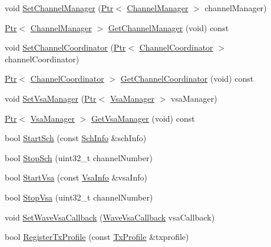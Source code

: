 \begin{DoxyCompactItemize}
\item 
void \hyperlink{classns3_1_1WaveNetDevice_acc72aa6c137e1c78c6e5bc3c19973ef4}{Set\+Channel\+Manager} (\hyperlink{classns3_1_1Ptr}{Ptr}$<$ \hyperlink{classns3_1_1ChannelManager}{Channel\+Manager} $>$ channel\+Manager)
\item 
\hyperlink{classns3_1_1Ptr}{Ptr}$<$ \hyperlink{classns3_1_1ChannelManager}{Channel\+Manager} $>$ \hyperlink{classns3_1_1WaveNetDevice_a4c0b3d018ff1ade5c8c9375d9e43f5ad}{Get\+Channel\+Manager} (void) const 
\item 
void \hyperlink{classns3_1_1WaveNetDevice_a0bd0431f70e5ea68ae818650b6ff06d8}{Set\+Channel\+Coordinator} (\hyperlink{classns3_1_1Ptr}{Ptr}$<$ \hyperlink{classns3_1_1ChannelCoordinator}{Channel\+Coordinator} $>$ channel\+Coordinator)
\item 
\hyperlink{classns3_1_1Ptr}{Ptr}$<$ \hyperlink{classns3_1_1ChannelCoordinator}{Channel\+Coordinator} $>$ \hyperlink{classns3_1_1WaveNetDevice_af2995fc465c490ae033e98c5beabd7f1}{Get\+Channel\+Coordinator} (void) const 
\item 
void \hyperlink{classns3_1_1WaveNetDevice_a67b70adf83f3029059e45b8f99901b9d}{Set\+Vsa\+Manager} (\hyperlink{classns3_1_1Ptr}{Ptr}$<$ \hyperlink{classns3_1_1VsaManager}{Vsa\+Manager} $>$ vsa\+Manager)
\item 
\hyperlink{classns3_1_1Ptr}{Ptr}$<$ \hyperlink{classns3_1_1VsaManager}{Vsa\+Manager} $>$ \hyperlink{classns3_1_1WaveNetDevice_a41e53ba04e34f65d93bbc34f088093db}{Get\+Vsa\+Manager} (void) const 
\item 
bool \hyperlink{classns3_1_1WaveNetDevice_a0d443497d2438fa48ef7ec72be6728fd}{Start\+Sch} (const \hyperlink{structns3_1_1SchInfo}{Sch\+Info} \&sch\+Info)
\item 
bool \hyperlink{classns3_1_1WaveNetDevice_aeaaa53f5a961de1acfd755c69bbab3fb}{Stop\+Sch} (uint32\+\_\+t channel\+Number)
\item 
bool \hyperlink{classns3_1_1WaveNetDevice_adb48d281cd174f232e8c4fc0b642573b}{Start\+Vsa} (const \hyperlink{structns3_1_1VsaInfo}{Vsa\+Info} \&vsa\+Info)
\item 
bool \hyperlink{classns3_1_1WaveNetDevice_a83693f1bee542812b303a76d065ed1b5}{Stop\+Vsa} (uint32\+\_\+t channel\+Number)
\item 
void \hyperlink{classns3_1_1WaveNetDevice_ab728ae9b274726d36112367b59a3906d}{Set\+Wave\+Vsa\+Callback} (\hyperlink{classns3_1_1WaveNetDevice_aa5c0bdf5b0cb42fbd142d42a755321df}{Wave\+Vsa\+Callback} vsa\+Callback)
\item 
bool \hyperlink{classns3_1_1WaveNetDevice_a9c79e073964d5d94bd6bf6facc7aad9b}{Register\+Tx\+Profile} (const \hyperlink{structns3_1_1TxProfile}{Tx\+Profile} \&txprofile)

\end{DoxyCompactItemize}
